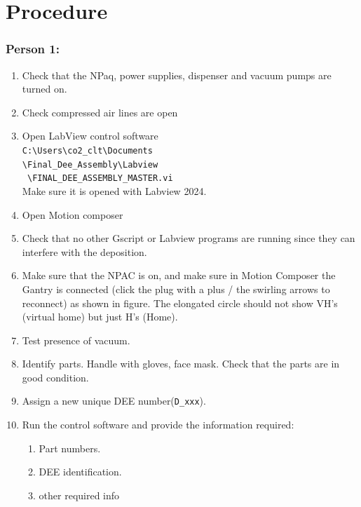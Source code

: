 \documentclass[12pt]{cornelltfpxsop}
\begin{document}
\section{Procedure}
\begin{paracol}{2} %

\subsubsection*{Person 1:}
\begin{enumerate}
    \item Check that the NPaq, power supplies, dispenser and vacuum pumps are\\turned on.
    \item Check compressed air lines are open
    \item Open LabView control software \\ \verb|C:\Users\co2_clt\Documents| \\ \verb|\Final_Dee_Assembly\Labview|\\ \verb| \FINAL_DEE_ASSEMBLY_MASTER.vi|\\ Make sure it is opened with Labview 2024.
    \item Open Motion composer
    \item Check that no other Gscript or Labview programs are running since they can interfere with the deposition.
    \item Make sure that the NPAC is on, and make sure in Motion Composer the Gantry is connected (click the plug with a plus / the swirling arrows to reconnect) as shown in figure. The elongated circle should not show VH's (virtual home) but just H's (Home).
    \item Test presence of vacuum.        
    \item Identify parts. Handle with gloves, face mask. Check that the parts are in good condition.
    \item Assign a new unique DEE number(\texttt{D\_xxx}).
    \item Run the control software and provide the information required:
    \begin{enumerate}
        \item Part numbers.
        \item DEE identification.
        \item other required info
    \end{enumerate}

\end{enumerate}
\end{paracol}
\end{document}
